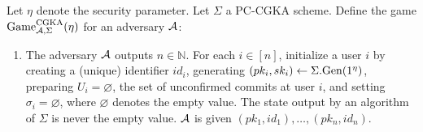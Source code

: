 \begin{definition}
	Let $\eta$ denote the security parameter.
	Let $\Sigma$ a PC-CGKA scheme. Define the game $\mathrm{Game}_{\mathcal{A}, \Sigma}^{\mathrm{CGKA}}(\eta)$ for an adversary $\mathcal{A}$:
	\begin{enumerate}[1.]
		\item \label{def:cgka-game-step-1} The adversary $\mathcal{A}$ outputs $n \in \mathbb{N}$. For each $i \in [n]$, initialize a user $i$ by creating a (unique) identifier $id_i$, generating $(pk_i, sk_i) \leftarrow \Sigma.\mathrm{Gen}(1^\eta)$, preparing $U_i = \varnothing$, the set of unconfirmed commits at user $i$, and setting $\sigma_i = \varnothing$, where $\varnothing$ denotes the empty value. The state output by an algorithm of $\Sigma$ is never the empty value. $\mathcal{A}$ is given $(pk_1, id_1), \ldots, (pk_n, id_n)$.


\end{enumerate}
\end{definition}
